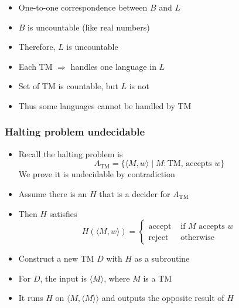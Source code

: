\begin{frame}[allowframebreaks]
\begin{itemize}
\item One-to-one correspondence between $B$ and $L$

\item $B$ is uncountable (like real numbers)

\item [] Therefore, $L$ is uncountable
\item Each TM $\Rightarrow$ handles one language in $L$

\item [] Set of TM is countable, but $L$ is not

\item Thus some languages cannot be handled by TM
\end{itemize}\end{frame}

\begin{frame}[allowframebreaks] \frametitle{Halting problem undecidable}
  \begin{itemize}
\item Recall the halting problem is
  \begin{equation*}
A_{\text{TM}}
=\{\langle M,w \rangle \mid M: \mbox{TM, accepts } w\}
\end{equation*}
We prove it is undecidable
by contradiction
\item Assume there is an $H$ that is a decider for $A_{\text{TM}}$
\item [] Then $H$ satisfies
  \begin{equation*}
    H(\langle  M,w\rangle )=
    \begin{cases}
      \mbox{accept} & \mbox{ if } M \mbox{ accepts } w\\
\mbox{reject} & \mbox{ otherwise}
    \end{cases}
  \end{equation*}
\item Construct a new TM $D$ with $H$ as a subroutine

\item For $D$, the input is $\langle  M\rangle $, where
  $M$ is a TM

\item [] It runs $H$ on $\langle  M,\langle  M\rangle \rangle $
and 
outputs the opposite result of $H$





\end{itemize}
\end{frame}

